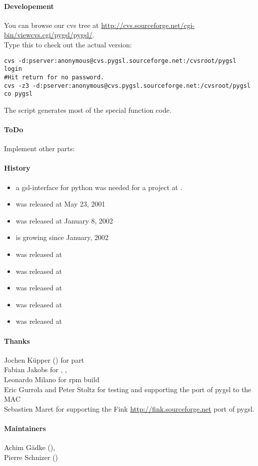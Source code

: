 \paragraph*{Developement}
You can browse our cvs tree at
\url{http://cvs.sourceforge.net/cgi-bin/viewcvs.cgi/pygsl/pygsl/}.
\\
Type this to check out the actual version:
\begin{verbatim}
cvs -d:pserver:anonymous@cvs.pygsl.sourceforge.net:/cvsroot/pygsl login
#Hit return for no password.
cvs -z3 -d:pserver:anonymous@cvs.pygsl.sourceforge.net:/cvsroot/pygsl co pygsl
\end{verbatim}
The script  generates most of the special 
function code.

%
\paragraph*{ToDo}
Implement other parts:


\paragraph*{History}
\begin{itemize}
\item a gsl-interface for python was needed for a project at
.
\item {} was released at May 23, 2001
\item {} was released at January 8, 2002
\item {} is growing since January, 2002
\item {} was released at 
\item {} was released at 
\item {} was released at 
\item {} was released at 
\item {} was released at 
\end{itemize}

\paragraph*{Thanks}
Jochen K\"upper () for 
 part\\
Fabian Jakobs for , 
, \\ 
Leonardo Milano for rpm build\\
Eric Gurrola and  Peter Stoltz for testing and supporting the port of pygsl to
the MAC\\
Sebastien Maret for supporting the Fink \url{http://fink.sourceforge.net}
port of pygsl.


\paragraph*{Maintainers}
Achim G\"adke (),\\
Pierre Schnizer ()

